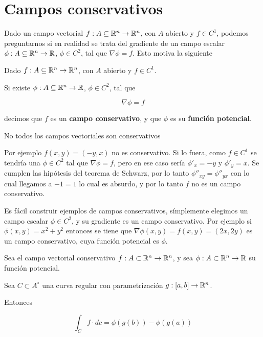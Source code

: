 \section{Campos conservativos}

Dado un campo vectorial $ f: A \subseteq \mathbb{R}^n \to \mathbb{R}^n$, con $A$ abierto y $f \in C^1$, podemos preguntarnos si en realidad se trata del gradiente de un campo escalar $\phi : A \subseteq \mathbb{R}^n \to \mathbb{R}$, $\phi \in C^2$, tal que $ \nabla \phi = f$.  Esto motiva la siguiente

\begin{definition}[Conservativo] 
Dado $ f: A \subseteq \mathbb{R}^n \to \mathbb{R}^n$, con $A$ abierto y $f \in C^1$.  

Si existe $\phi : A \subseteq \mathbb{R}^n \to \mathbb{R}$, $\phi \in C^2$, tal que 

$$ \nabla \phi = f$$

decimos que $f$ es un \textbf{campo conservativo}, y que $\phi$ es su \textbf{función potencial}. 
\end{definition}

\begin{example}{No todos los campos vectoriales son conservativos}

Por ejemplo $f(x,y) = (-y, x)$ no es conservativo.  Si lo fuera, como $f \in C^1$ se tendría una $ \phi \in C^2$ tal que $ \nabla \phi = f$, pero en ese caso sería $\phi'_x = -y$ y $\phi'_y = x$.  Se cumplen las hipótesis del teorema de Schwarz, por lo tanto $ \phi''_{xy} = \phi''_{yx}$ con lo cual llegamos a $ -1 = 1$ lo cual es absurdo, y por lo tanto $f$ no es un campo conservativo.
\end{example}

Es fácil construir ejemplos de campos conservativos, símplemente elegimos un campo escalar $ \phi \in C^2$, y su gradiente es un campo conservativo.  Por ejemplo si $\phi(x,y) = x^2 + y^2$ entonces se tiene que $\nabla \phi(x,y) = f(x,y) = (2x, 2y)$ es un campo conservativo, cuya función potencial es $\phi$.

\begin{theorem} 
Sea el campo vectorial conservativo $f : A \subset \mathbb{R}^n \to \mathbb{R}^n$, y sea $ \phi : A \subset \mathbb{R}^n \to \mathbb{R}$ su función potencial. 

Sea $ C \subset A^{\circ}$ una curva regular con parametrización $ g:[a,b] \to \mathbb{R}^n$.

Entonces 

$$ \int_C f \cdot dc = \phi(g(b)) - \phi(g(a)) $$
\end{theorem}

